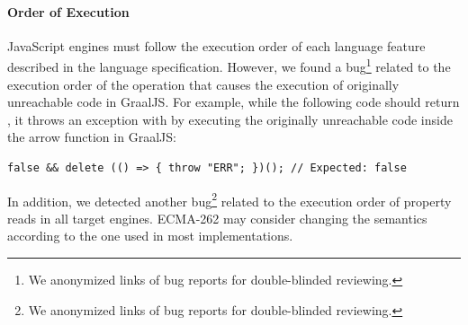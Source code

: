 \paragraph{\textbf{Order of Execution}}
%
JavaScript engines must follow the execution order of each language feature
described in the language specification.
%
However, we found a bug\footnote{
  We anonymized links of bug reports for double-blinded reviewing.
} related to the execution order of the  operation that causes
the execution of originally unreachable code in GraalJS.
%
For example, while the following code should return , it throws an
exception with  by executing the originally unreachable code
inside the arrow function in GraalJS:
%
\begin{lstlisting}[style=JS, basicstyle=\footnotesize\ttfamily]
    false && delete (() => { throw "ERR"; })(); // Expected: false
\end{lstlisting}
%
In addition, we detected another bug\footnote{
  We anonymized links of bug reports for double-blinded reviewing.
} related to the execution order of property reads
%
%
%
in all target engines. ECMA-262 may consider changing the semantics
according to the one used in most implementations.


